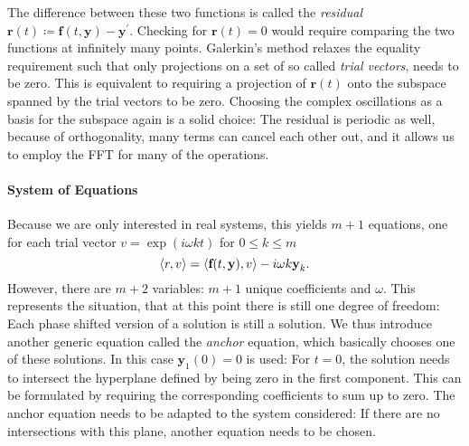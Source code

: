 The difference between these two functions is called the \emph{residual} $\textbf{r}(t) \coloneqq \textbf{f}(t,\textbf{y}) - \textbf{y}^\prime$.
Checking for $\textbf{r}(t) = 0$ would require comparing the two functions at infinitely many points.
Galerkin's method relaxes the equality requirement such that only projections on a set of so called \emph{trial vectors}, needs to be zero.
This is equivalent to requiring a projection of $\textbf{r}(t)$ onto the subspace spanned by the trial vectors to be zero.
Choosing the complex oscillations as a basis for the subspace again is a solid choice: The residual is periodic as well, because of orthogonality, many terms can cancel each other out, and it allows us to employ the FFT for many of the operations.

\paragraph{System of Equations} Because we are only interested in real systems, this yields $m+1$ equations, one for each trial vector $v = \exp\left( i \omega k t \right)$ for $0 \le k \le m$
\[
	\langle r , v \rangle = \langle \textbf{f}(t,\textbf{y}), v \rangle - i \omega k \textbf{y}_k \text.
\]
However, there are $m+2$ variables: $m+1$ unique coefficients and $\omega$.
This represents the situation, that at this point there is still one degree of freedom: Each phase shifted version of a solution is still a solution.
We thus introduce another generic equation called the \emph{anchor} equation, which basically chooses one of these solutions.
In this case $\textbf{y}_1(0) = 0$ is used:
For $t = 0$, the solution needs to intersect the hyperplane defined by being zero in the first component.
This can be formulated by requiring the corresponding coefficients to sum up to zero.
The anchor equation needs to be adapted to the system considered: If there are no intersections with this plane, another equation needs to be chosen.
